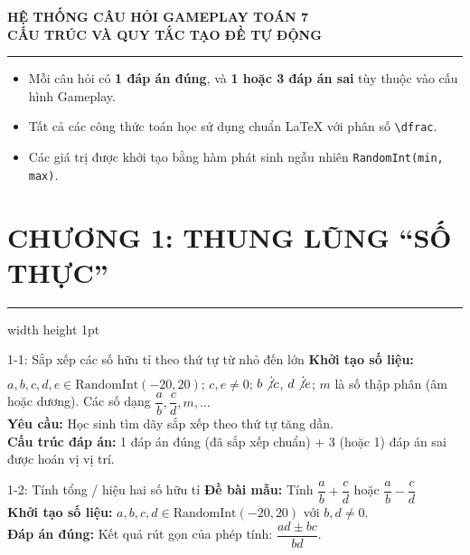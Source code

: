 \documentclass[11pt, a4paper]{article}
\begin{document}
\begin{center}
    {\LARGE \bfseries \color{primary} HỆ THỐNG CÂU HỎI GAMEPLAY TOÁN 7} \\[0.5em]
    {\large \bfseries \color{secondary} CẤU TRÚC VÀ QUY TẮC TẠO ĐỀ TỰ ĐỘNG} \\[0.3em]
    \rule{\linewidth}{1.5pt}
\end{center}

\begin{tcolorbox}[colback=primary!5, colframe=primary, title=MÔ TẢ QUY TẮC CHUNG]
\begin{itemize}[leftmargin=1.5em, itemsep=3pt]
    \item Mỗi câu hỏi có \textbf{1 đáp án đúng}, và \textbf{1 hoặc 3 đáp án sai} tùy thuộc vào cấu hình Gameplay.
    \item Tất cả các công thức toán học sử dụng chuẩn LaTeX với phân số \texttt{\textbackslash dfrac}.
    \item Các giá trị được khởi tạo bằng hàm phát sinh ngẫu nhiên \texttt{RandomInt(min, max)}.
\end{itemize}
\end{tcolorbox}

\vspace{1em}

\section*{\Large \color{primary} CHƯƠNG 1: THUNG LŨNG “SỐ THỰC”}
\hrule width \hsize height 1pt
\vspace{1em}

\begin{qbox}{1-1: Sắp xếp các số hữu tỉ theo thứ tự từ nhỏ đến lớn}
\textbf{Khởi tạo số liệu:} 
$a, b, c, d, e \in \text{RandomInt}(-20, 20)$; $c, e \neq 0$; $b \not\vdots c$, $d \not\vdots e$; $m$ là số thập phân (âm hoặc dương). Các số dạng $\dfrac{a}{b}, \dfrac{c}{d}, m, \dots$ \\[0.3em]
\textbf{Yêu cầu:} Học sinh tìm dãy sắp xếp theo thứ tự tăng dần. \\[0.3em]
\textbf{Cấu trúc đáp án:} 1 đáp án đúng (đã sắp xếp chuẩn) + 3 (hoặc 1) đáp án sai được hoán vị vị trí.
\end{qbox}

\begin{qbox}{1-2: Tính tổng / hiệu hai số hữu tỉ}
\textbf{Đề bài mẫu:} Tính $\dfrac{a}{b} + \dfrac{c}{d}$ hoặc $\dfrac{a}{b} - \dfrac{c}{d}$ \\[0.3em]
\textbf{Khởi tạo số liệu:} $a, b, c, d \in \text{RandomInt}(-20, 20)$ với $b, d \neq 0$. \\[0.3em]
\textbf{Đáp án đúng:} Kết quả rút gọn của phép tính: $\dfrac{ad \pm bc}{bd}$.
\end{qbox}
\end{document}
